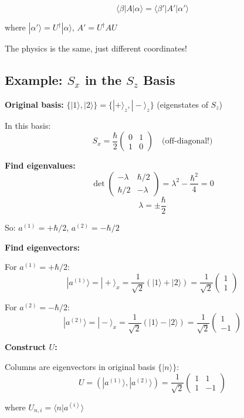\documentclass[11pt,a4paper]{article}
\begin{document}
$$\langle\beta|A|\alpha\rangle = \langle\beta'|A'|\alpha'\rangle$$

where $|\alpha'\rangle = U^\dagger|\alpha\rangle$, $A' = U^\dagger A U$

The physics is the same, just different coordinates!

\subsection*{Example: $S_x$ in the $S_z$ Basis}

\textbf{Original basis:} $\{|1\rangle, |2\rangle\} = \{|+\rangle_z, |-\rangle_z\}$ (eigenstates of $S_z$)

In this basis:
$$S_x = \frac{\hbar}{2}\begin{pmatrix} 0 & 1 \\ 1 & 0 \end{pmatrix} \quad \text{(off-diagonal!)}$$

\textbf{Find eigenvalues:}
$$\det\begin{pmatrix} -\lambda & \hbar/2 \\ \hbar/2 & -\lambda \end{pmatrix} = \lambda^2 - \frac{\hbar^2}{4} = 0$$
$$\lambda = \pm\frac{\hbar}{2}$$

So: $a^{(1)} = +\hbar/2$, $a^{(2)} = -\hbar/2$

\textbf{Find eigenvectors:}

For $a^{(1)} = +\hbar/2$:
$$|a^{(1)}\rangle = |+\rangle_x = \frac{1}{\sqrt{2}}(|1\rangle + |2\rangle) = \frac{1}{\sqrt{2}}\begin{pmatrix} 1 \\ 1 \end{pmatrix}$$

For $a^{(2)} = -\hbar/2$:
$$|a^{(2)}\rangle = |-\rangle_x = \frac{1}{\sqrt{2}}(|1\rangle - |2\rangle) = \frac{1}{\sqrt{2}}\begin{pmatrix} 1 \\ -1 \end{pmatrix}$$

\textbf{Construct $U$:}

Columns are eigenvectors in original basis $\{|n\rangle\}$:
$$U = (|a^{(1)}\rangle, |a^{(2)}\rangle) = \frac{1}{\sqrt{2}}\begin{pmatrix} 1 & 1 \\ 1 & -1 \end{pmatrix}$$

where $U_{n,i} = \langle n|a^{(i)}\rangle$
\end{document}
